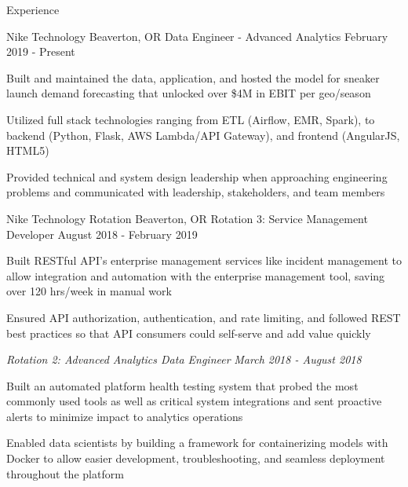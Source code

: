 \documentclass{resume}
\begin{document}
\begin{rSection}{Experience}

\begin{rSubsection}{Nike Technology}
                   {Beaverton, OR}
                   {Data Engineer - Advanced Analytics}
                   {February 2019 - Present}
    \item Built and maintained the data, application, and hosted the model for sneaker launch
          demand forecasting that unlocked over \$4M in EBIT per geo/season
    \item Utilized full stack technologies ranging from ETL (Airflow, EMR, Spark), to
          backend (Python, Flask, AWS Lambda/API Gateway), and frontend (AngularJS, HTML5)
    \item Provided technical and system design leadership when approaching engineering
          problems and communicated with leadership, stakeholders, and team members
\vspace{-2mm}
\end{rSubsection}


\begin{rSubsection}{Nike Technology Rotation}
                   {Beaverton, OR}
                   {Rotation 3: Service Management Developer}
                   {August 2018 - February 2019}
    \item Built RESTful API's enterprise management services like incident management
          to allow integration and automation with the enterprise management tool, saving
          over 120 hrs/week in manual work
    \item Ensured API authorization, authentication, and rate limiting, and followed REST best practices
          so that API consumers could self-serve and add value quickly

    \vspace{-1mm}
    {\em Rotation 2: Advanced Analytics Data Engineer} \hfill {\em March 2018 -  August 2018}
    \item Built an automated platform health testing system that probed the most
          commonly used tools as well as critical system integrations and sent
          proactive alerts to minimize impact to analytics operations
    \item Enabled data scientists by building a framework for containerizing models
          with Docker to allow easier development, troubleshooting, and seamless deployment
          throughout the platform


\end{rSubsection}
\end{rSection}
\end{document}
